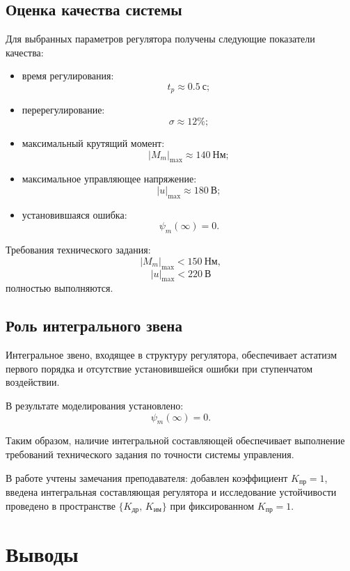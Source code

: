 \documentclass[a4paper, 14pt]{extarticle}
\begin{document}
\subsection{Оценка качества системы}

Для выбранных параметров регулятора получены следующие показатели качества:
\begin{itemize}
    \item время регулирования:
          \[
              t_p\approx0.5\ \text{с};
          \]
    \item перерегулирование:
          \[
              \sigma\approx12\%;
          \]
    \item максимальный крутящий момент:
          \[
              |M_m|_{\max}\approx140\ \text{Нм};
          \]
    \item максимальное управляющее напряжение:
          \[
              |u|_{\max}\approx180\ \text{В};
          \]
    \item установившаяся ошибка:
          \[
              \psi_m(\infty)=0.
          \]
\end{itemize}

Требования технического задания:
\[
    |M_m|_{\max}<150\ \text{Нм},
\]
\[
    |u|_{\max}<220\ \text{В}
\]
полностью выполняются.

\subsection{Роль интегрального звена}

Интегральное звено, входящее в структуру регулятора,
обеспечивает астатизм первого порядка и отсутствие
установившейся ошибки при ступенчатом воздействии.

В результате моделирования установлено:
\[
    \psi_m(\infty)=0.
\]

Таким образом, наличие интегральной составляющей
обеспечивает выполнение требований технического задания
по точности системы управления.

В работе учтены замечания преподавателя: добавлен коэффициент
$K_{\text{пр}}=1$, введена интегральная составляющая регулятора
и исследование устойчивости проведено в пространстве
$\{K_{\text{др}},\,K_{\text{им}}\}$ при фиксированном $K_{\text{пр}}=1$.

\newpage
\section*{Выводы}
\end{document}
